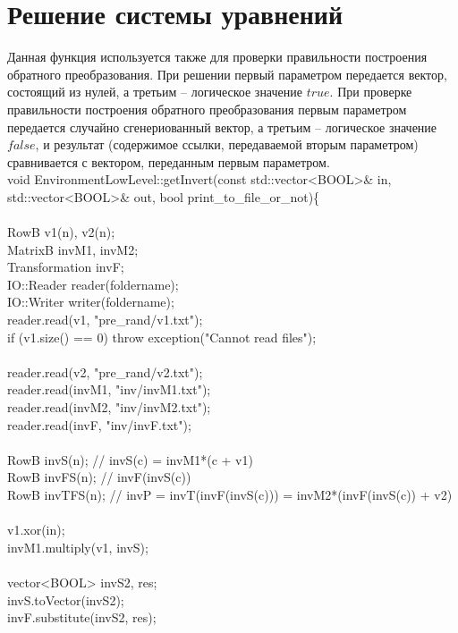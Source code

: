 \section{Решение системы уравнений}
Данная функция используется также для проверки правильности построения обратного преобразования. При решении первый параметром передается вектор, состоящий из нулей, а третьим – логическое значение \(true\). При проверке правильности построения обратного преобразования первым параметром передается случайно сгенериованный вектор, а третьим – логическое значение \(false\), и результат (содержимое ссылки, передаваемой вторым параметром) сравнивается с вектором, переданным первым параметром.\\

void EnvironmentLowLevel::getInvert(const std::vector<BOOL>\& in, std::vector<BOOL>\& out, bool print\_to\_file\_or\_not)\{\\
	\\
	RowB v1(n), v2(n);\\
	MatrixB invM1, invM2;\\
	Transformation invF;\\
	IO::Reader reader(foldername);\\
	IO::Writer writer(foldername);\\
	reader.read(v1, "pre\_rand/v1.txt");\\
	if (v1.size() == 0) throw exception("Cannot read files");\\
	\\
	reader.read(v2, "pre\_rand/v2.txt");\\
	reader.read(invM1, "inv/invM1.txt");\\
	reader.read(invM2, "inv/invM2.txt");\\
	reader.read(invF, "inv/invF.txt");\\
	\\
	RowB invS(n); // invS(c) = invM1*(c + v1)\\
	RowB invFS(n); // invF(invS(c))\\
	RowB invTFS(n);  // invP = invT(invF(invS(c))) = invM2*(invF(invS(c)) + v2)\\
	\\
	v1.xor(in);\\
	invM1.multiply(v1, invS); \\
	\\
	vector<BOOL> invS2, res;\\
	invS.toVector(invS2);\\
	invF.substitute(invS2, res);\\
